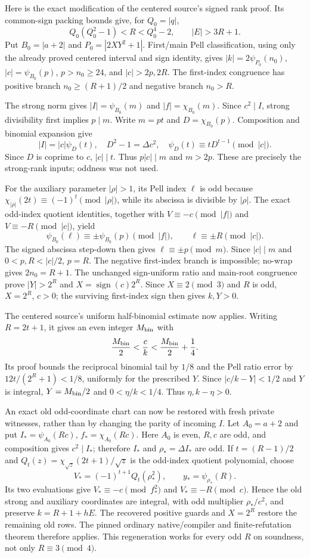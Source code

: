 Here is the exact modification of the centered source's signed rank
proof. Its common-sign packing bounds give, for $Q_0=|q|$,
\[
 Q_0(Q_0^2-1)<R<Q_0^4-2,
 \qquad |E|>3R+1.
\]
Put $B_0=|a+2|$ and $P_0=|2XY^2+1|$. First/main Pell classification,
using only the already proved centered interval and sign identity,
gives $|k|=2\psi_{P_0}(n_0)$, $|c|=\psi_{B_0}(p)$,
$p>n_0\ge24$, and $|c|>2p,2R$. The first-index congruence has
positive branch $n_0\ge(R+1)/2$ and negative branch $n_0>R$.

The strong norm gives $|I|=\psi_{B_0}(m)$ and
$|f|=\chi_{B_0}(m)$. Since $c^2\mid I$, strong divisibility first
implies $p\mid m$. Write $m=pt$ and $D=\chi_{B_0}(p)$. Composition
and binomial expansion give
\[
 |I|=|c|\psi_D(t),\quad D^2-1=\Delta c^2,\quad
 \psi_D(t)\equiv tD^{t-1}\pmod{|c|}.
\]
Since $D$ is coprime to $c$, $|c|\mid t$. Thus $p|c|\mid m$ and
$m>2p$. These are precisely the strong-rank inputs; oddness was not
used.

For the auxiliary parameter $|\rho|>1$, its Pell index $\ell$ is odd
because $\chi_{|\rho|}(2t)\equiv(-1)^t\pmod{|\rho|}$, while its
abscissa is divisible by $|\rho|$. The exact odd-index quotient
identities, together with $V\equiv-c\pmod{|f|}$ and
$V\equiv-R\pmod{|c|}$, yield
\[
 \psi_{B_0}(\ell)\equiv\pm\psi_{B_0}(p)\pmod{|f|},
 \qquad \ell\equiv\pm R\pmod{|c|}.
\]
The signed abscissa step-down then gives
$\ell\equiv\pm p\pmod m$. Since $|c|\mid m$ and
$0<p,R<|c|/2$, $p=R$. The negative first-index branch is impossible;
no-wrap gives $2n_0=R+1$. The unchanged sign-uniform ratio and main-root
congruence prove $|Y|>2^R$ and $X=\operatorname{sign}(c)2^R$.
Since $X\equiv2\pmod3$ and $R$ is odd, $X=2^R$, $c>0$;
the surviving first-index sign then gives $k,Y>0$.

The centered source's uniform half-binomial estimate now applies.
Writing $R=2t+1$, it gives an even integer $M_{\rm bin}$ with
\[
 \frac{M_{\rm bin}}2<\frac ck<\frac{M_{\rm bin}}2+\frac14.
\]
Its proof bounds the reciprocal binomial tail by $1/8$ and the Pell
ratio error by $12t/(2^R+1)<1/8$, uniformly for the prescribed $Y$.
Since $|c/k-Y|<1/2$ and $Y$ is integral,
$Y=M_{\rm bin}/2$ and $0<\eta/k<1/4$. Thus $\eta,k-\eta>0$.

An exact old odd-coordinate chart can now be restored with fresh
private witnesses, rather than by changing the parity of incoming $I$.
Let $A_0=a+2$ and put
$I_* =\psi_{A_0}(Rc)$, $f_* =\chi_{A_0}(Rc)$.
Here $A_0$ is even, $R,c$ are odd, and composition gives $c^2\mid I_*$;
therefore $I_*$ and $\rho_* =\Delta I_*$ are odd. If $t=(R-1)/2$ and
$Q_t(z)=\chi_{\sqrt z}(2t+1)/\sqrt z$ is the odd-index quotient
polynomial, choose
\[
 V_*=(-1)^{t+1}Q_t(\rho_*^2),\qquad y_*=\psi_{\rho_*}(R).
\]
Its two evaluations give $V_*\equiv-c\pmod{f_*^2}$ and
$V_*\equiv-R\pmod c$. Hence the old strong and auxiliary coordinates
are integral, with odd multiplier $\rho_*/c^2$, and preserve
$k=R+1+hE$. The recovered positive guards and $X=2^R$ restore the
remaining old rows. The pinned ordinary native/compiler and
finite-refutation theorem therefore applies. This regeneration works
for every odd $R$ on soundness, not only $R\equiv3\pmod4$.

